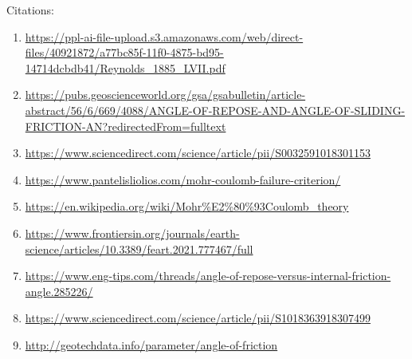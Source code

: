 \documentclass[xcolor=dvipsnames,10pt,hidelinks]{article}
\begin{document}
\begin{itemize}
Citations:
\begin{enumerate}
\item \url{https://ppl-ai-file-upload.s3.amazonaws.com/web/direct-files/40921872/a77bc85f-11f0-4875-bd95-14714dcbdb41/Reynolds\_1885\_LVII.pdf}
\item \url{https://pubs.geoscienceworld.org/gsa/gsabulletin/article-abstract/56/6/669/4088/ANGLE-OF-REPOSE-AND-ANGLE-OF-SLIDING-FRICTION-AN?redirectedFrom=fulltext}
\item \url{https://www.sciencedirect.com/science/article/pii/S0032591018301153}
\item \url{https://www.pantelisliolios.com/mohr-coulomb-failure-criterion/}
\item \url{https://en.wikipedia.org/wiki/Mohr\%E2\%80\%93Coulomb\_theory}
\item \url{https://www.frontiersin.org/journals/earth-science/articles/10.3389/feart.2021.777467/full}
\item \url{https://www.eng-tips.com/threads/angle-of-repose-versus-internal-friction-angle.285226/}
\item \url{https://www.sciencedirect.com/science/article/pii/S1018363918307499}
\item \url{http://geotechdata.info/parameter/angle-of-friction}
\end{enumerate}
\end{itemize}
\end{document}
